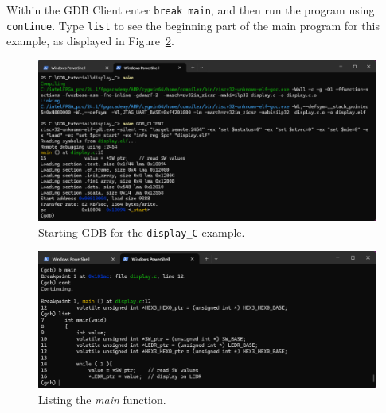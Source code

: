\documentclass[11pt, twoside, pdftex]{article}
\begin{document}
Within the GDB Client enter \texttt{break main}, and then run the program using \texttt{continue}.
Type \texttt{list} to see the beginning part of the main program for this example, as displayed in 
Figure~\ref{fig:display_C1}.

\begin{figure}[h]
    \begin{center}
        \includegraphics[scale=.6]{figures/display_C0.png}
        \caption{Starting GDB for the \texttt{display\_C} example.}
        \label{fig:display_C0}
    \end{center}
\end{figure}

\begin{figure}[h]
    \begin{center}
        \includegraphics[scale=.6]{figures/display_C1.png}
        \caption{Listing the {\it main} function.}
        \label{fig:display_C1}
    \end{center}
\end{figure}
\end{document}
